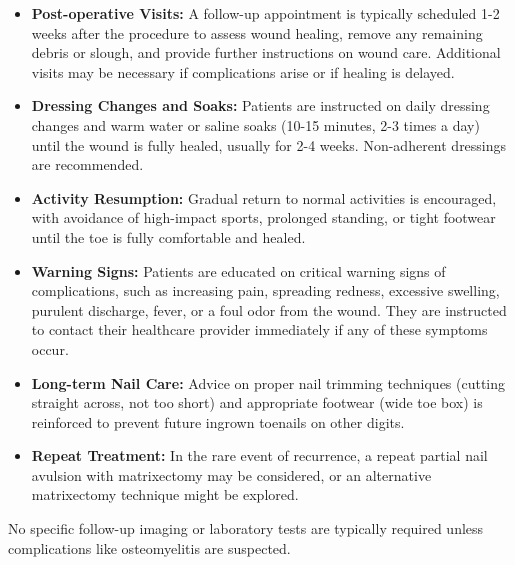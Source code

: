 \begin{itemize}
  \item  \textbf{Post-operative Visits:} A follow-up appointment is typically scheduled 1-2 weeks after the procedure to assess wound healing, remove any remaining debris or slough, and provide further instructions on wound care. Additional visits may be necessary if complications arise or if healing is delayed.
  \item  \textbf{Dressing Changes and Soaks:} Patients are instructed on daily dressing changes and warm water or saline soaks (10-15 minutes, 2-3 times a day) until the wound is fully healed, usually for 2-4 weeks. Non-adherent dressings are recommended.
  \item  \textbf{Activity Resumption:} Gradual return to normal activities is encouraged, with avoidance of high-impact sports, prolonged standing, or tight footwear until the toe is fully comfortable and healed.
  \item  \textbf{Warning Signs:} Patients are educated on critical warning signs of complications, such as increasing pain, spreading redness, excessive swelling, purulent discharge, fever, or a foul odor from the wound. They are instructed to contact their healthcare provider immediately if any of these symptoms occur.
  \item  \textbf{Long-term Nail Care:} Advice on proper nail trimming techniques (cutting straight across, not too short) and appropriate footwear (wide toe box) is reinforced to prevent future ingrown toenails on other digits.
  \item  \textbf{Repeat Treatment:} In the rare event of recurrence, a repeat partial nail avulsion with matrixectomy may be considered, or an alternative matrixectomy technique might be explored.
\end{itemize}
No specific follow-up imaging or laboratory tests are typically required unless complications like osteomyelitis are suspected.

